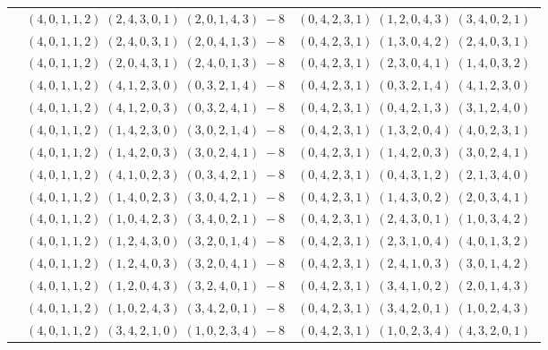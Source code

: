 \documentclass[11pt]{article}
\begin{document}
\begin{longtable}[l]{|c|c|c|}
 \cline{2-3} 
 & $(4 ,0 ,1 ,1 ,2) \;(2 ,4 ,3 ,0 ,1) \;(2 ,0 ,1 ,4 ,3) \;-8$ & $(0 ,4 ,2 ,3 ,1) \;(1 ,2 ,0 ,4 ,3) \;(3 ,4 ,0 ,2 ,1) \;$\\ 
 \cline{2-3} 
 & $(4 ,0 ,1 ,1 ,2) \;(2 ,4 ,0 ,3 ,1) \;(2 ,0 ,4 ,1 ,3) \;-8$ & $(0 ,4 ,2 ,3 ,1) \;(1 ,3 ,0 ,4 ,2) \;(2 ,4 ,0 ,3 ,1) \;$\\ 
 \cline{2-3} 
 & $(4 ,0 ,1 ,1 ,2) \;(2 ,0 ,4 ,3 ,1) \;(2 ,4 ,0 ,1 ,3) \;-8$ & $(0 ,4 ,2 ,3 ,1) \;(2 ,3 ,0 ,4 ,1) \;(1 ,4 ,0 ,3 ,2) \;$\\ 
 \cline{2-3} 
 & $(4 ,0 ,1 ,1 ,2) \;(4 ,1 ,2 ,3 ,0) \;(0 ,3 ,2 ,1 ,4) \;-8$ & $(0 ,4 ,2 ,3 ,1) \;(0 ,3 ,2 ,1 ,4) \;(4 ,1 ,2 ,3 ,0) \;$\\ 
 \cline{2-3} 
 & $(4 ,0 ,1 ,1 ,2) \;(4 ,1 ,2 ,0 ,3) \;(0 ,3 ,2 ,4 ,1) \;-8$ & $(0 ,4 ,2 ,3 ,1) \;(0 ,4 ,2 ,1 ,3) \;(3 ,1 ,2 ,4 ,0) \;$\\ 
 \cline{2-3} 
 & $(4 ,0 ,1 ,1 ,2) \;(1 ,4 ,2 ,3 ,0) \;(3 ,0 ,2 ,1 ,4) \;-8$ & $(0 ,4 ,2 ,3 ,1) \;(1 ,3 ,2 ,0 ,4) \;(4 ,0 ,2 ,3 ,1) \;$\\ 
 \cline{2-3} 
 & $(4 ,0 ,1 ,1 ,2) \;(1 ,4 ,2 ,0 ,3) \;(3 ,0 ,2 ,4 ,1) \;-8$ & $(0 ,4 ,2 ,3 ,1) \;(1 ,4 ,2 ,0 ,3) \;(3 ,0 ,2 ,4 ,1) \;$\\ 
 \cline{2-3} 
 & $(4 ,0 ,1 ,1 ,2) \;(4 ,1 ,0 ,2 ,3) \;(0 ,3 ,4 ,2 ,1) \;-8$ & $(0 ,4 ,2 ,3 ,1) \;(0 ,4 ,3 ,1 ,2) \;(2 ,1 ,3 ,4 ,0) \;$\\ 
 \cline{2-3} 
 & $(4 ,0 ,1 ,1 ,2) \;(1 ,4 ,0 ,2 ,3) \;(3 ,0 ,4 ,2 ,1) \;-8$ & $(0 ,4 ,2 ,3 ,1) \;(1 ,4 ,3 ,0 ,2) \;(2 ,0 ,3 ,4 ,1) \;$\\ 
 \cline{2-3} 
 & $(4 ,0 ,1 ,1 ,2) \;(1 ,0 ,4 ,2 ,3) \;(3 ,4 ,0 ,2 ,1) \;-8$ & $(0 ,4 ,2 ,3 ,1) \;(2 ,4 ,3 ,0 ,1) \;(1 ,0 ,3 ,4 ,2) \;$\\ 
 \cline{2-3} 
 & $(4 ,0 ,1 ,1 ,2) \;(1 ,2 ,4 ,3 ,0) \;(3 ,2 ,0 ,1 ,4) \;-8$ & $(0 ,4 ,2 ,3 ,1) \;(2 ,3 ,1 ,0 ,4) \;(4 ,0 ,1 ,3 ,2) \;$\\ 
 \cline{2-3} 
 & $(4 ,0 ,1 ,1 ,2) \;(1 ,2 ,4 ,0 ,3) \;(3 ,2 ,0 ,4 ,1) \;-8$ & $(0 ,4 ,2 ,3 ,1) \;(2 ,4 ,1 ,0 ,3) \;(3 ,0 ,1 ,4 ,2) \;$\\ 
 \cline{2-3} 
 & $(4 ,0 ,1 ,1 ,2) \;(1 ,2 ,0 ,4 ,3) \;(3 ,2 ,4 ,0 ,1) \;-8$ & $(0 ,4 ,2 ,3 ,1) \;(3 ,4 ,1 ,0 ,2) \;(2 ,0 ,1 ,4 ,3) \;$\\ 
 \cline{2-3} 
 & $(4 ,0 ,1 ,1 ,2) \;(1 ,0 ,2 ,4 ,3) \;(3 ,4 ,2 ,0 ,1) \;-8$ & $(0 ,4 ,2 ,3 ,1) \;(3 ,4 ,2 ,0 ,1) \;(1 ,0 ,2 ,4 ,3) \;$\\ 
 \cline{2-3} 
 & $(4 ,0 ,1 ,1 ,2) \;(3 ,4 ,2 ,1 ,0) \;(1 ,0 ,2 ,3 ,4) \;-8$ & $(0 ,4 ,2 ,3 ,1) \;(1 ,0 ,2 ,3 ,4) \;(4 ,3 ,2 ,0 ,1) \;$\\ 

\end{longtable}
\end{document}

